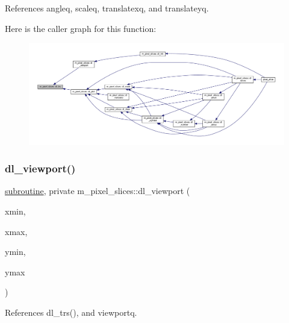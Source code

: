 References angleq, scaleq, translatexq, and translateyq.

Here is the caller graph for this function\+:
\nopagebreak
\begin{figure}[H]
\begin{center}
\leavevmode
\includegraphics[width=350pt]{namespacem__pixel__slices_a141b4da9ce5a0d633cc488f656c0320d_icgraph}
\end{center}
\end{figure}
\mbox{\label{namespacem__pixel__slices_a87a664883c6c5e0e2812df4d1ea29515}} 
\subsubsection{\texorpdfstring{dl\+\_\+viewport()}{dl\_viewport()}}
{\footnotesize\ttfamily \hyperlink{M__stopwatch_83_8txt_acfbcff50169d691ff02d4a123ed70482}{subroutine}, private m\+\_\+pixel\+\_\+slices\+::dl\+\_\+viewport (\begin{DoxyParamCaption}\item[{}]{xmin,  }\item[{}]{xmax,  }\item[{}]{ymin,  }\item[{}]{ymax }\end{DoxyParamCaption})\hspace{0.3cm}{\ttfamily [private]}}



References dl\+\_\+trs(), and viewportq.

